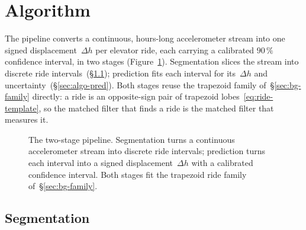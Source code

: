 \documentclass[manuscript,review,screen]{acmart}
\begin{document}
\section{Algorithm}
\label{sec:algorithm}

The pipeline converts a continuous, hours-long accelerometer stream
into one signed displacement~$\Delta h$ per elevator ride, each
carrying a calibrated $90\,\%$ confidence interval, in two stages
(Figure~\ref{fig:pipeline}).  Segmentation slices the stream into
discrete ride intervals~(\S\ref{sec:algo-seg}); prediction fits each
interval for its~$\Delta h$ and uncertainty~(\S\ref{sec:algo-pred}).
Both stages reuse the trapezoid family of~\S\ref{sec:bg-family}
directly: a ride is an opposite-sign pair of trapezoid
lobes~\eqref{eq:ride-template}, so the matched filter that finds a
ride is the matched filter that measures it.

\begin{figure}[H]
\centering
{}
\caption{The two-stage pipeline.  Segmentation turns a continuous
  accelerometer stream into discrete ride intervals; prediction turns
  each interval into a signed displacement~$\Delta h$ with a
  calibrated confidence interval.  Both stages fit the trapezoid ride
  family of~\S\ref{sec:bg-family}.}
\label{fig:pipeline}
\end{figure}

\subsection{Segmentation}
\label{sec:algo-seg}
\end{document}
